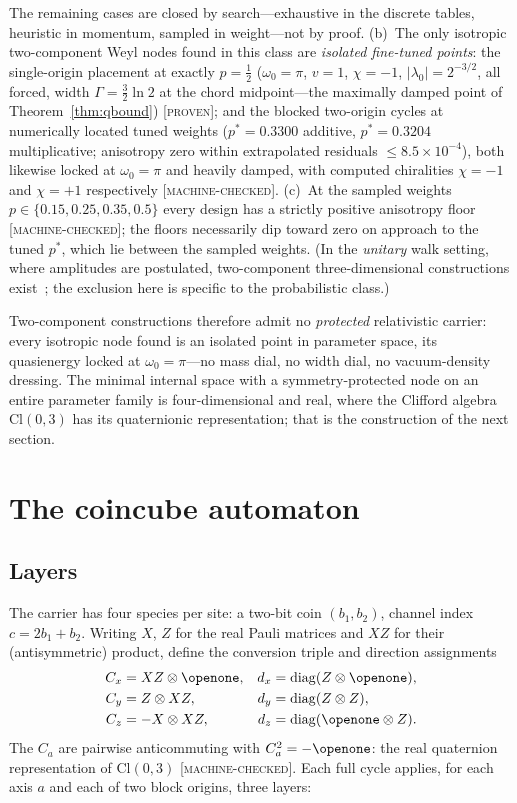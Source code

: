 \documentclass[aps,prd,twocolumn,superscriptaddress,nofootinbib,floatfix]{revtex4-2}
\newcommand{\evP}{\textnormal{\textsc{[proven]}}}
\newcommand{\evM}{\textnormal{\textsc{[machine-checked]}}}
\begin{document}
The remaining cases are closed by search---exhaustive in the discrete
tables, heuristic in momentum, sampled in weight---not by proof.
(b)~The only isotropic two-component Weyl nodes found in this class are
\emph{isolated fine-tuned points}: the single-origin placement at
exactly $p=\tfrac12$
($\omega_0=\pi$, $v=1$, $\chi=-1$, $|\lambda_0|=2^{-3/2}$, all forced,
width $\Gamma=\tfrac32\ln2$ at the chord midpoint---the maximally
damped point of Theorem~\ref{thm:qbound}) \evP{}; and the blocked
two-origin cycles at numerically located tuned weights ($p^*=0.3300$
additive, $p^*=0.3204$ multiplicative; anisotropy zero within
extrapolated residuals $\le8.5\times10^{-4}$), both likewise locked at
$\omega_0=\pi$ and heavily damped, with computed chiralities $\chi=-1$
and $\chi=+1$ respectively \evM{}. (c)~At the sampled weights
$p\in\{0.15,0.25,0.35,0.5\}$ every design has a strictly positive
anisotropy floor \evM{}; the floors necessarily dip toward zero on
approach to the tuned $p^*$, which lie between the sampled weights.
(In the \emph{unitary} walk setting, where amplitudes are postulated,
two-component three-dimensional constructions
exist~\cite{Chandrashekar,DArianoErba}; the exclusion here is specific
to the probabilistic class.)

Two-component constructions therefore admit no \emph{protected}
relativistic carrier: every isotropic node found is an isolated point in
parameter space, its quasienergy locked at $\omega_0=\pi$---no mass dial,
no width dial, no vacuum-density dressing. The minimal internal space
with a symmetry-protected node on an entire parameter family is
four-dimensional and real, where the Clifford algebra $\mathrm{Cl}(0,3)$
has its quaternionic representation; that is the construction of the next
section.
\section{The coincube automaton}
\label{sec:coincube}

\subsection{Layers}

The carrier has four species per site: a two-bit coin $(b_1,b_2)$, channel
index $c=2b_1+b_2$. Writing $X$, $Z$ for the real Pauli matrices and
$XZ$ for their (antisymmetric) product, define the conversion triple and
direction assignments
\begin{align}
C_x &= XZ\otimes\openone, & d_x &= \mathrm{diag}(Z\otimes\openone),
\nonumber\\
C_y &= Z\otimes XZ, & d_y &= \mathrm{diag}(Z\otimes Z),
\nonumber\\
C_z &= -X\otimes XZ, & d_z &= \mathrm{diag}(\openone\otimes Z).
\label{eq:tables}
\end{align}
The $C_a$ are pairwise anticommuting with $C_a^2=-\openone$: the real
quaternion representation of $\mathrm{Cl}(0,3)$ \evM{}. Each full cycle
applies, for each axis $a$ and each of two block origins, three layers:
\end{document}
